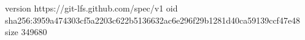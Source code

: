 version https://git-lfs.github.com/spec/v1
oid sha256:3959a474303cf5a2203c622b5136632ac6e296f29b1281d40ca59139ccf47e48
size 349680

